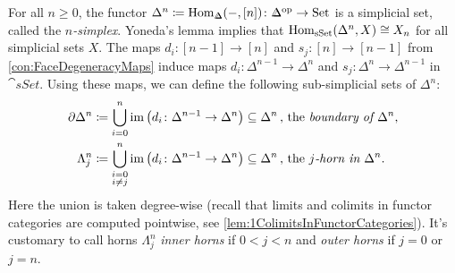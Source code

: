 \begin{numpar}\label{par:Horns}
	For all $n\geqslant 0$, the functor $\Delta^n\coloneqq\Hom_{\IDelta}(-,[n])\colon \IDelta^\op\rightarrow\cat{Set}$ is a simplicial set, called the \emph{$n$-simplex}. Yoneda's lemma implies that $\operatorname{Hom}_{\mathrm{sSet}}(\Delta^n,X)\cong X_n$ for all simplicial sets $X$. The maps $d_i\colon [n-1]\rightarrow [n]$ and $s_j\colon [n]\rightarrow[n-1]$ from \cref{con:FaceDegeneracyMaps} induce maps $d_i\colon \Delta^{n-1}\rightarrow \Delta^n$ and $s_j\colon \Delta^n\rightarrow \Delta^{n-1}$ in $\cat{sSet}$. Using these maps, we can define the following sub-simplicial sets of $\Delta^n$:
	\begin{align*}
		\partial \Delta^n&\coloneqq \bigcup_{i=0}^n\operatorname{im}\left(d_i\colon \Delta^{n-1}\rightarrow\Delta^n\right)\subseteq \Delta^n\,\text{, the \emph{boundary of $\Delta^n$},}\\
		\Lambda_j^n&\coloneqq \bigcup_{\substack{i=0\\i\neq j}}^n\operatorname{im}\left(d_i\colon \Delta^{n-1}\rightarrow\Delta^n\right)\subseteq \Delta^n\,\text{, the \emph{$j$-horn in $\Delta^n$}.}
	\end{align*}
	Here the union is taken degree-wise (recall that limits and colimits in functor categories are computed pointwise, see \cref{lem:1ColimitsInFunctorCategories}). It's customary to call horns $\Lambda_j^n$ \emph{inner horns} if $0<j<n$ and \emph{outer horns} if $j=0$ or $j=n$.
	

\end{numpar}
